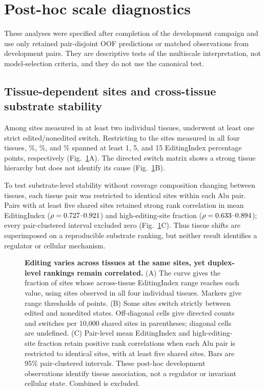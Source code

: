 \documentclass[9pt,twoside]{pnas-new}
\begin{document}


\section{Post-hoc scale diagnostics}\label{si:diagnostics}

These analyses were specified after completion of the development campaign and use only retained pair-disjoint OOF predictions or matched observations from development pairs. They are descriptive tests of the multiscale interpretation, not model-selection criteria, and they do not use the canonical test.

\subsection*{Tissue-dependent sites and cross-tissue substrate stability}

Among \NMatchedSitesTwoTissues{} sites measured in at least two individual tissues, \NStrictSwitchSites{} underwent at least one strict edited/nonedited switch. Restricting to the \NMatchedSitesFourTissues{} sites measured in all four tissues, \AllFourRangeOnePct{}\%, \AllFourRangeFivePct{}\%, and \AllFourRangeFifteenPct{}\% spanned at least 1, 5, and 15 EditingIndex percentage points, respectively (Fig.~\ref{fig:s7_context}A). The directed switch matrix shows a strong tissue hierarchy but does not identify its cause (Fig.~\ref{fig:s7_context}B).

To test substrate-level stability without coverage composition changing between tissues, each tissue pair was restricted to identical sites within each Alu pair. Pairs with at least five shared sites retained strong rank correlation in mean EditingIndex ($\rho=0.727{}\text{--}0.921{}$) and high-editing-site fraction ($\rho=0.633{}\text{--}0.894{}$); every pair-clustered interval excluded zero (Fig.~\ref{fig:s7_context}C). Thus tissue shifts are superimposed on a reproducible substrate ranking, but neither result identifies a regulator or cellular mechanism.

\begin{figure}[t!]
\centering

\caption{\textbf{Editing varies across tissues at the same sites, yet duplex-level rankings remain correlated.} (A) The curve gives the fraction of sites whose across-tissue EditingIndex range reaches each value, using sites observed in all four individual tissues. Markers give range thresholds of \RangeThresholdList{} points. (B) Some sites switch strictly between edited and nonedited states. Off-diagonal cells give directed counts and switches per 10,000 shared sites in parentheses; diagonal cells are undefined. (C) Pair-level mean EditingIndex and high-editing-site fraction retain positive rank correlations when each Alu pair is restricted to identical sites, with at least five shared sites. Bars are 95\% pair-clustered intervals. These post-hoc development observations identify tissue association, not a regulator or invariant cellular state. Combined is excluded.}
\label{fig:s7_context}
\end{figure}
\end{document}
